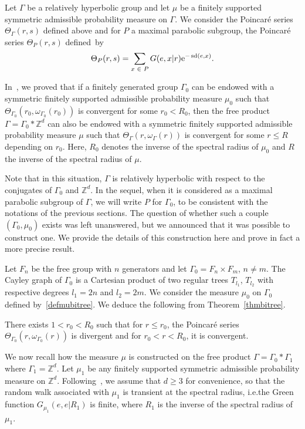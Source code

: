 \documentclass[AHL,Unicode,longabstracts]{cedram}
\newcommand{\Z}{\mathbb{Z}}
\newcommand{\rme}{\mathrm{e}}
\DeclareMathOperator{\sd}{sd}
\let\oldin\in
\renewcommand{\in}{\mathchoice{\oldin}{\oldin}{\,\oldin\,}{\,\oldin\,}}
\begin{document}
Let $\Gamma$ be a relatively hyperbolic group and let $\mu$ be a finitely supported symmetric admissible probability measure on $\Gamma$. We consider the Poincaré series $\Theta_\Gamma(r,s)$ defined above and for $P$ a maximal parabolic subgroup, the Poincaré series $\Theta_P(r,s)$ defined~by
\[
\Theta_P(r,s)=\sum_{x\in P}G(e,x|r)\rme^{-\sd(e,x)}.
\]

In~\cite[Example~C]{DWY}, we proved that if a finitely generated group $\Gamma_0$ can be endowed with a symmetric finitely supported admissible probability measure $\mu_0$ such that $\Theta_{\Gamma_0}(r_0,\omega_{\Gamma_0}(r_0))$ is convergent for some $r_0<R_0$, then the free product $\Gamma=\Gamma_0*\Z^d$ can also be endowed with a symmetric finitely supported admissible probability measure $\mu$ such that $\Theta_{\Gamma}(r,\omega_{\Gamma}(r))$ is convergent for some $r\leq R$ depending on $r_0$. Here, $R_0$ denotes the inverse of the spectral radius of $\mu_0$ and $R$ the inverse of the spectral radius of $\mu$.

Note that in this situation, $\Gamma$ is relatively hyperbolic with respect to the conjugates of $\Gamma_0$ and $\Z^d$. In the sequel, when it is considered as a maximal parabolic subgroup of $\Gamma$, we will write $P$ for $\Gamma_0$, to be consistent with the notations of the previous sections. The question of whether such a couple $(\Gamma_0,\mu_0)$ exists was left unanswered, but we announced that it was possible to construct one. We provide the details of this construction here and prove in fact a more precise result.

\medskip
Let $F_n$ be the free group with $n$ generators and let $\Gamma_0=F_n\times F_m$, $n\neq m$. The Cayley graph of $\Gamma_0$ is a Cartesian product of two regular trees $T_{l_1}$, $T_{l_2}$ {with respective degrees $l_1 = 2n$ and $l_2 = 2m$}. We consider the measure $\mu_0$ on $\Gamma_0$ defined by~\eqref{defmubitree}. We deduce the following from Theorem~\ref{thmbitree}.

\begin{prop}\label{transitionphaseparabolicsubgroup}
There exists $1<r_0 <R_0$ such that for $r\leq r_0$, the Poincaré series $\Theta_{\Gamma_0}(r,\omega_{\Gamma_0}(r))$ is divergent and for $r_0<r<R_0$, it is convergent.
\end{prop}

We now recall how the measure $\mu$ is constructed on the free product $\Gamma=\Gamma_0*\Gamma_1$ where $\Gamma_1=\Z^d$. Let $\mu_1$ be any finitely supported symmetric admissible probability measure on $\Z^d$. Following~\cite{DWY}, we assume that $d\geq3$ for convenience, so that the random walk associated with $\mu_1$ is transient at the spectral radius, i.e.the Green function $G_{\mu_1}(e,e|R_1)$ is finite, where $R_1$ is the inverse of the spectral radius of $\mu_1$.
\end{document}

